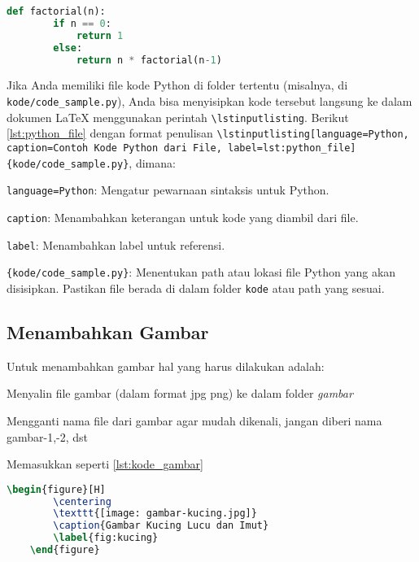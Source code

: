 \begin{lstlisting}[language=Python, caption=Contoh Kode Python Langsung, label=lst:python_direct]
    def factorial(n):
        if n == 0:
            return 1
        else:
            return n * factorial(n-1)
\end{lstlisting}

Jika Anda memiliki file kode Python di folder tertentu (misalnya, di \texttt{kode/code\_sample.py}), Anda bisa menyisipkan kode tersebut langsung ke dalam dokumen LaTeX menggunakan perintah \texttt{\textbackslash lstinputlisting}. Berikut \cref{lst:python_file} dengan format penulisan \texttt{\textbackslash lstinputlisting[language=Python, caption=Contoh Kode Python dari File, label=lst:python\_file]\{kode/code\_sample.py\}}, dimana:
\begin{packed_item}
    \item \texttt{language=Python}: Mengatur pewarnaan sintaksis untuk Python.
    \item \texttt{caption}: Menambahkan keterangan untuk kode yang diambil dari file.
    \item \texttt{label}: Menambahkan label untuk referensi.
    \item \texttt{\{kode/code\_sample.py\}}: Menentukan path atau lokasi file Python yang akan disisipkan. Pastikan file berada di dalam folder \texttt{kode} atau path yang sesuai.
\end{packed_item}



\subsection{Menambahkan Gambar}
Untuk menambahkan gambar hal yang harus dilakukan adalah:
\begin{packed_enum}
    \item Menyalin file gambar (dalam format jpg \/ png) ke dalam folder \textit{gambar}
    \item Mengganti nama file dari gambar agar mudah dikenali, jangan diberi nama gambar-1,-2, dst
    \item Memasukkan seperti \cref{lst:kode_gambar}
\end{packed_enum}

\begin{lstlisting}[language=TeX, caption=Kode untuk Menyisipkan Gambar dalam Dokumen, label=lst:kode_gambar]
    \begin{figure}[H]
        \centering
        \texttt{[image: gambar-kucing.jpg]}
        \caption{Gambar Kucing Lucu dan Imut}
        \label{fig:kucing}
    \end{figure}
\end{lstlisting}

